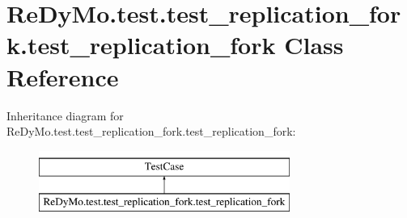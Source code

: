 \hypertarget{classReDyMo_1_1test_1_1test__replication__fork_1_1test__replication__fork}{}\section{Re\+Dy\+Mo.\+test.\+test\+\_\+replication\+\_\+fork.\+test\+\_\+replication\+\_\+fork Class Reference}
\label{classReDyMo_1_1test_1_1test__replication__fork_1_1test__replication__fork}
Inheritance diagram for Re\+Dy\+Mo.\+test.\+test\+\_\+replication\+\_\+fork.\+test\+\_\+replication\+\_\+fork\+:\begin{figure}[H]
\begin{center}
\leavevmode
\includegraphics[height=2.000000cm]{classReDyMo_1_1test_1_1test__replication__fork_1_1test__replication__fork}
\end{center}
\end{figure}
